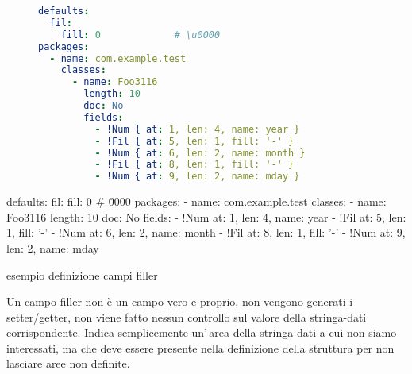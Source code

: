 \ifesource
\begin{figure*}[!htb]
\begin{lstlisting}[language=yaml, 
caption={esempio definizione campi filler}, 
label=lst:xmplFil]
defaults:
  fil:
    fill: 0             # \u0000
packages:
  - name: com.example.test
    classes:
      - name: Foo3116
        length: 10
        doc: No
        fields:
          - !Num { at: 1, len: 4, name: year }
          - !Fil { at: 5, len: 1, fill: '-' }
          - !Num { at: 6, len: 2, name: month }
          - !Fil { at: 8, len: 1, fill: '-' }
          - !Num { at: 9, len: 2, name: mday }
\end{lstlisting}
\end{figure*}
\else
\begin{elisting}[!htb]
\begin{yamlcode}
defaults:
  fil:
    fill: 0             # \u0000
packages:
  - name: com.example.test
    classes:
      - name: Foo3116
        length: 10
        doc: No
        fields:
          - !Num { at: 1, len: 4, name: year }
          - !Fil { at: 5, len: 1, fill: '-' }
          - !Num { at: 6, len: 2, name: month }
          - !Fil { at: 8, len: 1, fill: '-' }
          - !Num { at: 9, len: 2, name: mday }
\end{yamlcode}
\caption{esempio definizione campi filler}
\label{lst:xmplFil}
\end{elisting}
\fi
Un campo filler non è un campo vero e proprio, non vengono generati i
setter/getter, non viene fatto nessun controllo sul valore della stringa-dati
corrispondente. Indica semplicemente un'\,area della stringa-dati a cui non 
siamo interessati, ma che deve essere presente nella definizione della 
struttura per non lasciare aree non definite.

